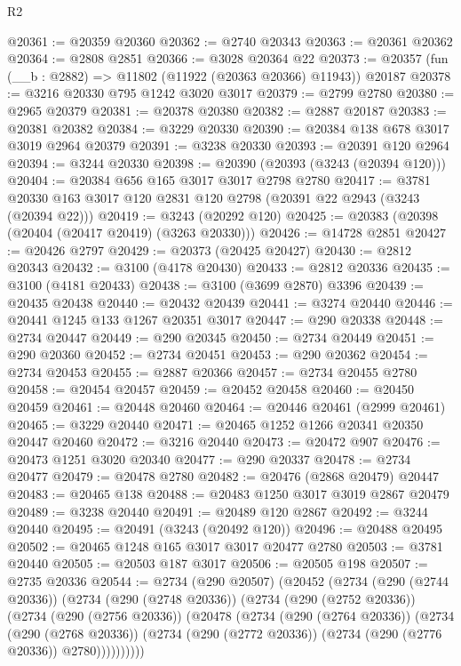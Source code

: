 \begin{lexlean}{R2}
\begin{coremodule}
@20361 := @20359 @20360
@20362 := @2740 @20343
@20363 := @20361 @20362
@20364 := @2808 @2851
@20366 := @3028 @20364 @22
@20373 := @20357 (fun (__b : @2882) => @11802 (@11922 (@20363 @20366) @11943)) @20187
@20378 := @3216 @20330 @795 @1242 @3020 @3017
@20379 := @2799 @2780
@20380 := @2965 @20379
@20381 := @20378 @20380
@20382 := @2887 @20187
@20383 := @20381 @20382
@20384 := @3229 @20330
@20390 := @20384 @138 @678 @3017 @3019 @2964 @20379
@20391 := @3238 @20330
@20393 := @20391 @120 @2964
@20394 := @3244 @20330
@20398 := @20390 (@20393 (@3243 (@20394 @120)))
@20404 := @20384 @656 @165 @3017 @3017 @2798 @2780
@20417 := @3781 @20330 @163 @3017 @120 @2831 @120 @2798 (@20391 @22 @2943 (@3243 (@20394 @22)))
@20419 := @3243 (@20292 @120)
@20425 := @20383 (@20398 (@20404 (@20417 @20419) (@3263 @20330)))
@20426 := @14728 @2851
@20427 := @20426 @2797
@20429 := @20373 (@20425 @20427)
@20430 := @2812 @20343
@20432 := @3100 (@4178 @20430)
@20433 := @2812 @20336
@20435 := @3100 (@4181 @20433)
@20438 := @3100 (@3699 @2870) @3396
@20439 := @20435 @20438
@20440 := @20432 @20439
@20441 := @3274 @20440
@20446 := @20441 @1245 @133 @1267 @20351 @3017
@20447 := @290 @20338
@20448 := @2734 @20447
@20449 := @290 @20345
@20450 := @2734 @20449
@20451 := @290 @20360
@20452 := @2734 @20451
@20453 := @290 @20362
@20454 := @2734 @20453
@20455 := @2887 @20366
@20457 := @2734 @20455 @2780
@20458 := @20454 @20457
@20459 := @20452 @20458
@20460 := @20450 @20459
@20461 := @20448 @20460
@20464 := @20446 @20461 (@2999 @20461)
@20465 := @3229 @20440
@20471 := @20465 @1252 @1266 @20341 @20350 @20447 @20460
@20472 := @3216 @20440
@20473 := @20472 @907
@20476 := @20473 @1251 @3020 @20340
@20477 := @290 @20337
@20478 := @2734 @20477
@20479 := @20478 @2780
@20482 := @20476 (@2868 @20479) @20447
@20483 := @20465 @138
@20488 := @20483 @1250 @3017 @3019 @2867 @20479
@20489 := @3238 @20440
@20491 := @20489 @120 @2867
@20492 := @3244 @20440
@20495 := @20491 (@3243 (@20492 @120))
@20496 := @20488 @20495
@20502 := @20465 @1248 @165 @3017 @3017 @20477 @2780
@20503 := @3781 @20440
@20505 := @20503 @187 @3017
@20506 := @20505 @198
@20507 := @2735 @20336
@20544 := @2734
    (@290 @20507)
    (@20452
      (@2734
        (@290 (@2744 @20336))
        (@2734
          (@290 (@2748 @20336))
          (@2734
            (@290 (@2752 @20336))
            (@2734
              (@290 (@2756 @20336))
              (@20478
                (@2734
                  (@290 (@2764 @20336))
                  (@2734
                    (@290 (@2768 @20336))
                    (@2734 (@290 (@2772 @20336)) (@2734 (@290 (@2776 @20336)) @2780))))))))))

\end{coremodule}
\end{lexlean}
